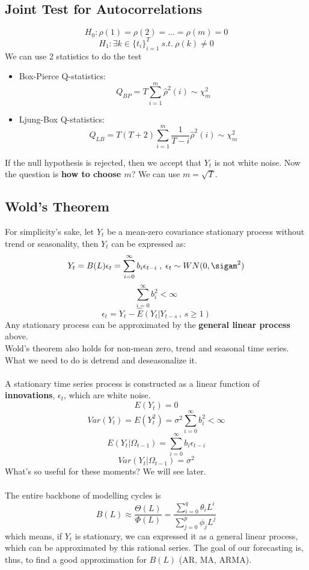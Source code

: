 \documentclass{article}
\begin{document}
\subsection{Joint Test for Autocorrelations}
$$H_0: \rho(1) = \rho(2) = ... = \rho(m) = 0$$
$$H_1: \exists k\in \{t_i\}_{i=1}^T \ s.t. \ \rho(k) \neq 0$$
We can use 2 statistics to do the test
\begin{itemize}
    \item Box-Pierce Q-statistics: $$Q_{BP} = T \sum_{i=1}^m \hat{\rho}^2 (i)\sim \chi_m^2$$
    \item Ljung-Box Q-statistics: $$Q_{LB} = T(T+2) \sum_{i=1}^m \frac{1}{T-i}\hat{\rho}^2 (i)\sim \chi_m^2$$
\end{itemize}
If the null hypothesis is rejected, then we accept that $Y_t$ is not white noise. Now the question is \textbf{how to choose $m$}? We can use \textbf{$m = \sqrt{T}$}.

\subsection{Wold's Theorem}
For simplicity's sake, let $Y_t$ be a mean-zero covariance stationary process without trend or seasonality, then $Y_t$ can be expressed as:
$$Y_t = B(L)\epsilon_t = \sum_{i=0}^\infty b_i \epsilon_{t-i} \; , \; \epsilon_t \sim WN(0,\sigam^2)$$
$$\sum_{i=0}^\infty b_i^2 < \infty$$
$$\epsilon_t = Y_t - \hat{E}(Y_t|Y_{t-s}\, ,\, s \geq 1)$$
Any stationary process can be approximated by the \textbf{general linear process} above.\\
{\footnotesize{Wold's theorem also holds for non-mean zero, trend and seasonal time series. What we need to do is detrend and deseasonalize it.}}\\
\\
A stationary time series process is constructed as a linear function of \textbf{innovations}, $\epsilon_t$, which are white noise.\\
$$E(Y_t) = 0$$
$$Var(Y_t) = E(Y_t^2) = \sigma^2 \sum_{i=0}^\infty b_i^2 < \infty$$
$$E(Y_t|\Omega_{t-1}) = \sum_{i=0}^\infty b_i \epsilon_{t-i}$$
$$Var(Y_t|\Omega_{t-1}) = \sigma^2$$
What's so useful for these moments? We will see later.\\
\\
The entire backbone of modelling cycles is 
$$B(L) \approx \frac{\Theta(L)}{\Phi(L)} = \frac{\sum_{i=0}^q \theta_i L^i}{\sum_{j=0}^p \phi_j L^j}$$
which means, if $Y_t$ is stationary, we can expressed it as a general linear process, which can be approximated by this rational series. The goal of our forecasting is, thus, to find a good approximation for $B(L)$ (AR, MA, ARMA).
\end{document}
